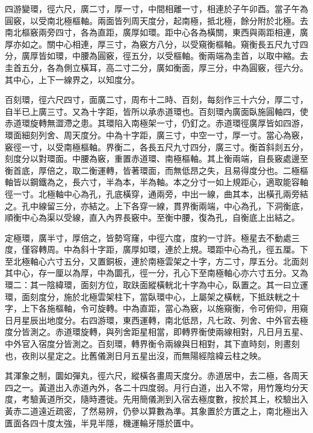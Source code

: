 \begin{pinyinscope}
 四游變環，徑六尺，廣二寸，厚一寸，中間相離一寸，相連於子午卯酉。當子午為圓竅，以受南北極樞軸。兩面皆列周天度分，起南極，抵北極，餘分附於北極。去南北樞竅兩旁四寸，各為直距，廣厚如環。距中心各為橫關，東西與兩距相連，廣厚亦如之。關中心相連，厚三寸，為竅方八分，以受窺衡樞軸。窺衡長五尺九寸四分，廣厚皆如環，中腰為圓竅，徑五分，以受樞軸。衡兩端為圭首，以取中縮。去圭首五分，各為側立橫耳，高二寸二分，廣如衡面，厚三分，中為圓竅，徑六分。其中心，上下一線界之，以知度分。



 百刻環，徑六尺四寸，面廣二寸，周布十二時、百刻，每刻作三十六分，厚二寸，自半已上廣三寸。又為十字距，皆所以承赤道環也。百刻環內廣面臥施圓軸四，使赤道環旋轉無澀滯之患。其環陷入南極架一寸，仍釘之。赤道環徑廣厚皆如四游，環面細刻列舍、周天度分。中為十字距，廣三寸，中空一寸，厚一寸。當心為竅，竅徑一寸，以受南極樞軸。界衡二，各長五尺九寸四分，廣三寸。衡首斜剡五分，刻度分以對環面。中腰為竅，重置赤道環、南極樞軸。其上衡兩端，自長竅處邊至衡首底，厚倍之，取二衡運轉，皆著環面，而無低昂之失，且易得度分也。二極樞軸皆以鋼鐵為之，長六寸，半為本，半為軸。本之分寸一如上規距心，適取能容軸徑一寸。北極軸中心為孔，孔底橫穿，通兩旁，中出一線，曲其本，出橫孔兩旁結之。孔中線留三分，亦結之。上下各穿一線，貫界衡兩端，中心為孔，下洞衡底，順衡中心為渠以受線，直入內界長竅中。至衡中腰，復為孔，自衡底上出結之。



 定極環，廣半寸，厚倍之，皆勢穹窿，中徑六度，度約一寸許。極星去不動處三度，僅容轉周。中為斜十字距，廣厚如環，連於上規。環距中心為孔，徑五厘。下至北極軸心六寸五分，又置銅板，連於南極雲架之十字，方二寸，厚五分。北面剡其中心，存一厘以為厚，中為圜孔，徑一分，孔心下至南極軸心亦六寸五分。又為環二：其一陰緯環，面刻方位，取趺面縱橫輄北十字為中心，臥置之。其一曰立運環，面刻度分，施於北極雲架柱下，當臥環中心，上屬架之橫輄，下抵趺輄之十字，上下各施樞軸，令可旋轉。中為直距，當心為竅，以施窺衡，令可俯仰，用窺日月星辰出地度分。右四游環，東西運轉，南北低昂，凡七政、列舍、中外官去極度分皆測之。赤道環旋轉，與列舍距星相當，即轉界衡使兩線相對，凡日月五星、中外官入宿度分皆測之。百刻環，轉界衡令兩線與日相對，其下直時刻，則晝刻也，夜則以星定之。比舊儀測日月五星出沒，而無陽經陰緯云柱之映。



 其渾象之制，圜如彈丸，徑六尺，縱橫各畫周天度分。赤道居中，去二極，各周天四之一。黃道出入赤道內外，各二十四度弱。月行白道，出入不常，用竹篾均分天度，考驗黃道所交，隨時遷徙。先用簡儀測到入宿去極度數，按於其上，校驗出入黃赤二道遠近疏密，了然易辨，仍參以算數為準。其象置於方匱之上，南北極出入匱面各四十度太強，半見半隱，機運輪牙隱於匱中。




\end{pinyinscope}
